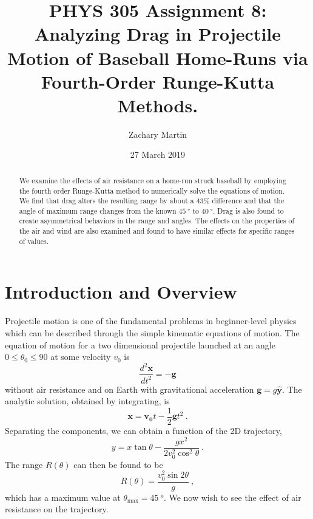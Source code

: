 \documentclass[aps,prl,twocolumn,superscriptaddress]{revtex4-1}
\begin{document}
\title{PHYS 305 Assignment 8: Analyzing Drag in Projectile Motion of Baseball Home-Runs via Fourth-Order Runge-Kutta Methods.}
\author{Zachary Martin}
\date{27 March 2019}

\begin{abstract}
We examine the effects of air resistance on a home-run struck baseball by employing the fourth order Runge-Kutta method to numerically solve the equations of motion. We find that drag alters the resulting range by about a $43$\% difference and that the angle of maximum range changes from the known $\SI{45}{\degree}$ to $\SI{40}{\degree}$. Drag is also found to create asymmetrical behaviors in the range and angles. The effects on the properties of the air and wind are also examined and found to have similar effects for specific ranges of values.
\end{abstract}

\maketitle

\section{Introduction and Overview}
Projectile motion is one of the fundamental problems in beginner-level physics which can be described through the simple kinematic equations of motion. The equation of motion for a two dimensional projectile launched at an angle $0 \leqslant \theta_0 \leqslant 90$ at some velocity $v_0$ is
\begin{equation}
\frac{d^2\bm{x}}{dt^2} = -\bm{g} \label{eq:dvdttrue}
\end{equation}
without air resistance and on Earth with gravitational acceleration $\bm{g} = g\bm{\hat{y}}$. The analytic solution, obtained by integrating, is
\begin{equation}
\bm{x} = \bm{v_0}t - \frac{1}{2}\bm{g}t^2 ~. \label{eq:truesol}
\end{equation}
Separating the components, we can obtain a function of the 2D trajectory,
\begin{equation}
y =  x\tan\theta - \frac{g x^2}{2 v_0^2\cos^2\theta} ~. \label{eq:trajtrue}
\end{equation}
The range $R(\theta)$ can then be found to be
\begin{equation}
R(\theta) = \frac{v_0^2 \sin 2\theta}{g} ~,\label{eq:range}
\end{equation}
which has a maximum value at $\theta_{\text{max}} = \SI{45}{\degree}$.
We now wish to see the effect of air resistance on the trajectory.
\end{document}

